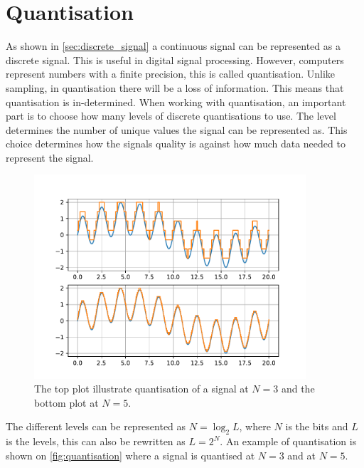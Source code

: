 \section{Quantisation}
As shown in \autoref{sec:discrete_signal} a continuous signal can be represented as a discrete signal. This is useful in digital signal processing. However, computers represent numbers with a finite precision, this is called quantisation. Unlike sampling, in quantisation there will be a loss of information. This means that quantisation is in-determined. When working with quantisation, an important part is to choose how many levels of discrete quantisations to use. The level determines the number of unique values the signal can be represented as.
This choice determines how the signals quality is against how much data needed to represent the signal.  
\begin{figure}[H]
    \centering
    \includegraphics[width=0.9\textwidth]{figures/quantisationFig.pdf}
    \caption{The top plot illustrate quantisation of a signal at $N=3$ and the bottom plot at $N=5$.}
    \label{fig:quantisation}
\end{figure}
The different levels can be represented as $N=\log_{2} L$, where $N$ is the bits and $L$ is the levels, this can also be rewritten as $L=2^{N}$. An example of quantisation is shown on \autoref{fig:quantisation} where a signal is quantised at $N=3$ and at $N=5$. 


